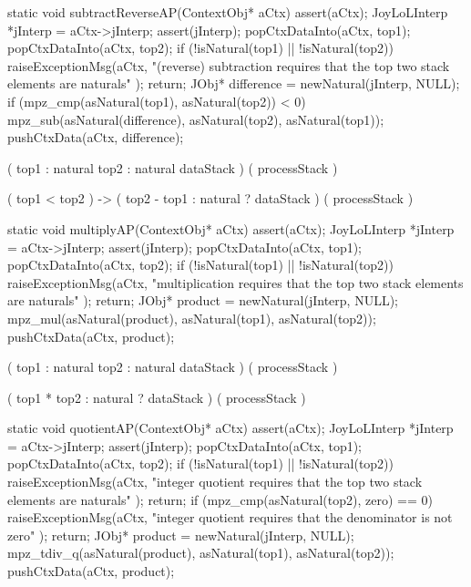 \stopWord

\startCCode
static void subtractReverseAP(ContextObj* aCtx) {
  assert(aCtx);
  JoyLoLInterp *jInterp = aCtx->jInterp;
  assert(jInterp);
  popCtxDataInto(aCtx, top1);
  popCtxDataInto(aCtx, top2);
  if (!isNatural(top1) || !isNatural(top2)) {
    raiseExceptionMsg(aCtx,
      "(reverse) subtraction requires that the top two stack elements are naturals"
    );
    return;
  }
  JObj* difference = newNatural(jInterp, NULL);
  if (mpz_cmp(asNatural(top1), asNatural(top2)) < 0) {
    mpz_sub(asNatural(difference), asNatural(top2), asNatural(top1));
  }
  pushCtxData(aCtx, difference);
}
\stopCCode

\startWord[subtractReverse]

\preDataStack
  (
    top1 : natural
    top2 : natural
    dataStack
  )
\preProcessStack
  ( processStack )
\preConditions
\stopPreStack

\postDataStack
  ( top1 < top2 ) -> (
    top2 - top1 : natural ?
    dataStack
  )
\postProcessStack
  ( processStack )
\postConditions
\stopPostStack

\stopWord

\startCCode
static void multiplyAP(ContextObj* aCtx) {
  assert(aCtx);
  JoyLoLInterp *jInterp = aCtx->jInterp;
  assert(jInterp);
  popCtxDataInto(aCtx, top1);
  popCtxDataInto(aCtx, top2);
  if (!isNatural(top1) || !isNatural(top2)) {
    raiseExceptionMsg(aCtx,
      "multiplication requires that the top two stack elements are naturals"
    );
    return;
  }
  JObj* product = newNatural(jInterp, NULL);
  mpz_mul(asNatural(product), asNatural(top1), asNatural(top2));
  pushCtxData(aCtx, product);
}
\stopCCode

\startWord[mulitply]

\preDataStack
  (
    top1 : natural
    top2 : natural
    dataStack
  )
\preProcessStack
  ( processStack )
\preConditions
\stopPreStack

\postDataStack
  (
    top1 * top2 : natural ?
    dataStack
  )
\postProcessStack
  ( processStack )
\postConditions
\stopPostStack

\stopWord

\startCCode
static void quotientAP(ContextObj* aCtx) {
  assert(aCtx);
  JoyLoLInterp *jInterp = aCtx->jInterp;
  assert(jInterp);
  popCtxDataInto(aCtx, top1);
  popCtxDataInto(aCtx, top2);
  if (!isNatural(top1) || !isNatural(top2)) {
    raiseExceptionMsg(aCtx,
      "integer quotient requires that the top two stack elements are naturals"
    );
    return;
  }
  if (mpz_cmp(asNatural(top2), zero) == 0) {
    raiseExceptionMsg(aCtx,
      "integer quotient requires that the denominator is not zero"
    );
    return;
  }
  JObj* product = newNatural(jInterp, NULL);
  mpz_tdiv_q(asNatural(product), asNatural(top1), asNatural(top2));
  pushCtxData(aCtx, product);
}

